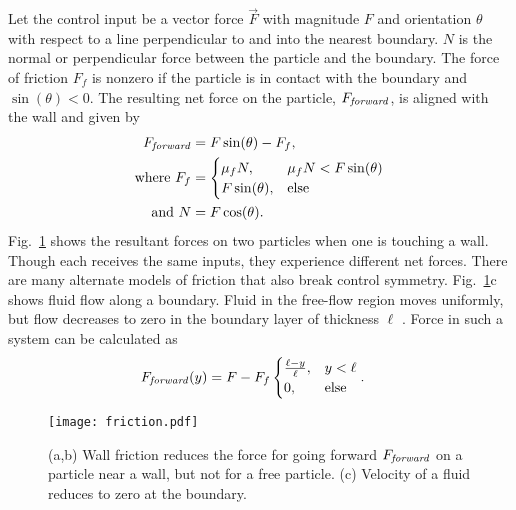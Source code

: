 Let the control input be a vector force $\vec{F}$ with magnitude $F$ and orientation $\theta$ with respect to a line perpendicular to and into the nearest boundary. $N$ is the normal or perpendicular force between the particle and the boundary. The force of friction $F_f$ is nonzero if the particle is in contact with the boundary and  $\sin(\theta) < 0$. The resulting net force on the particle, $F_{\text{\emph{forward}}}$, is aligned with the wall and given by
\begin{align}
F_{\text{\emph{forward}}} &=  F \sin(\theta) - F_f , \nonumber \\
\text{where }  F_f &= \begin{cases}  \mu_f N, &  \mu_f N < F \sin(\theta)  \label{eq:frictionmodel}  \\
F \sin(\theta), & \text{else} \end{cases} \\ %
\text{and } N &= F \cos(\theta) .\nonumber
\end{align}
 Fig.~\ref{fig:friction} shows the resultant forces on two particles when one is touching a wall. 
Though each receives the same inputs,  they experience different net forces.
There are many alternate models of friction that also break control symmetry. Fig.~\ref{fig:friction}c shows fluid flow along a boundary.  Fluid in the free-flow region moves uniformly, but flow decreases to zero in the boundary layer of thickness $\ell$ \cite{fluidMechanics}.  Force in such a system can be calculated as
\begin{align}
F_{\text{\emph{forward}}}(y) &= F - F_f\begin{cases}  \frac{\ell-y}{\ell}   , &  y<\ell \label{eq:boundarylayerflow} \\
0, & \text{else} \end{cases}.
\end{align}

\begin{figure}[tb]
\begin{center}
\texttt{[image: friction.pdf]} 
\vspace{-1em}
\caption{(a,b) Wall friction reduces the force for going forward $F_{\text{\emph{forward}}}$ on a particle near a wall, but not for a free particle. (c) Velocity of a fluid reduces to zero at the boundary.
\label{fig:friction}
}\vspace{-2em}
\end{center}
\end{figure} 




